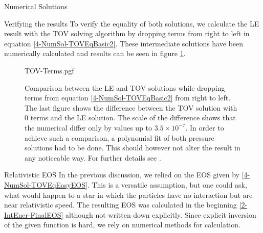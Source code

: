 \begin{section}{Numerical Solutions}
\begin{subsection}{Verifying the results}
To verify the equality of both solutions, we calculate the LE result with the TOV solving algorithm by dropping terms from right to left in equation \ref{4-NumSol-TOVEqBasic2}. These intermediate solutions have been numerically calculated and results can be seen in figure \ref{4-NumSol-TovTerms}.
\begin{figure}[H]
	\centering
	{TOV-Terms.pgf}
	\caption[Comparison LE and partial TOV]{Comparison between the LE and TOV solutions while dropping terms from equation \ref{4-NumSol-TOVEqBasic2} from right to left. The last figure shows the difference between the TOV solution with 0 terms and the LE solution. The scale of the difference shows that the numerical differ only by values up to $3.5\times10^{-7}$. In order to achieve such a comparison, a polynomial fit of both pressure solutions had to be done. This should however not alter the result in any noticeable way. For further details see \cite{pleyerGithubRepositoryJonas}.}
	\label{4-NumSol-TovTerms}
\end{figure}

\end{subsection}
%
%
\begin{subsection}{Relativistic EOS}
In the previous discussion, we relied on the EOS given by \ref{4-NumSol-TOVEqEasyEOS}. This is a versatile assumption, but one could ask, what would happen to a star in which the particles have no interaction but are near relativistic speed. The resulting EOS was calculated in the beginning \ref{2-IntEner-FinalEOS} although not written down explicitly. Since explicit inversion of the given function is hard, we rely on numerical methods for calculation.
\end{subsection}
%
%
\end{section}
